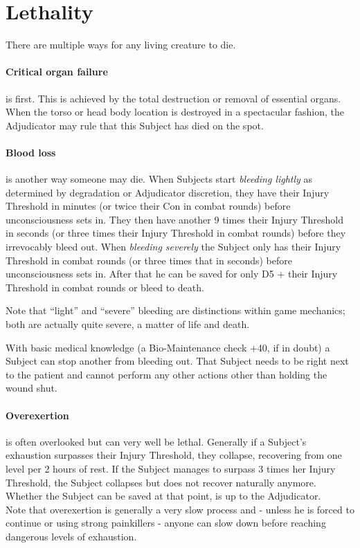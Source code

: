 \documentclass[11pt,a4paper,openany,dvipsnames]{book}
\begin{document}
	\section{Lethality}
	\label{sec:lethality}
	There are multiple ways for any living creature to die.
	\paragraph{Critical organ failure} is first.
	This is achieved by the total destruction or removal of essential organs.
	When the torso or head body location is destroyed in a spectacular fashion,
		the Adjudicator may rule that this Subject has died on the spot.
	\paragraph{Blood loss} is another way someone may die.
	When Subjects start \emph{bleeding lightly} as determined by degradation or Adjudicator discretion,
	they have their Injury Threshold in minutes (or twice their Con in combat rounds) before unconsciousness sets in.
	They then have another 9 times their Injury Threshold in seconds (or three times their Injury Threshold in combat rounds) before they irrevocably bleed out.
    When \emph{bleeding severely} the Subject only has
    	their Injury Threshold in combat rounds (or three times that in seconds)
    	before unconsciousness sets in.
	After that he can be saved for only D5 + their Injury Threshold in combat rounds or bleed to death.
	\begin{exampleblock}
		Note that “light” and “severe” bleeding are distinctions within game mechanics;
		both are actually quite severe, a matter of life and death.
	\end{exampleblock}
	With basic medical knowledge (a Bio-Maintenance check +40, if in doubt)
		a Subject can stop another from bleeding out.
	That Subject needs to be right next to the patient
		and cannot perform any other actions other than holding the wound shut.
	\paragraph{Overexertion} is often overlooked but can very well be lethal.
	Generally if a Subject’s exhaustion surpasses their Injury Threshold,
		they collapse, recovering from one level per 2 hours of rest.
    If the Subject manages to surpass 3 times her Injury Threshold,
    	the Subject collapses but does not recover naturally anymore.
    Whether the Subject can be saved at that point,
    	is up to the Adjudicator.
    \\%
	Note that overexertion is generally a very slow process
		and - unless he is forced to continue or using strong painkillers -
		anyone can slow down before reaching dangerous levels of exhaustion.
\end{document}
